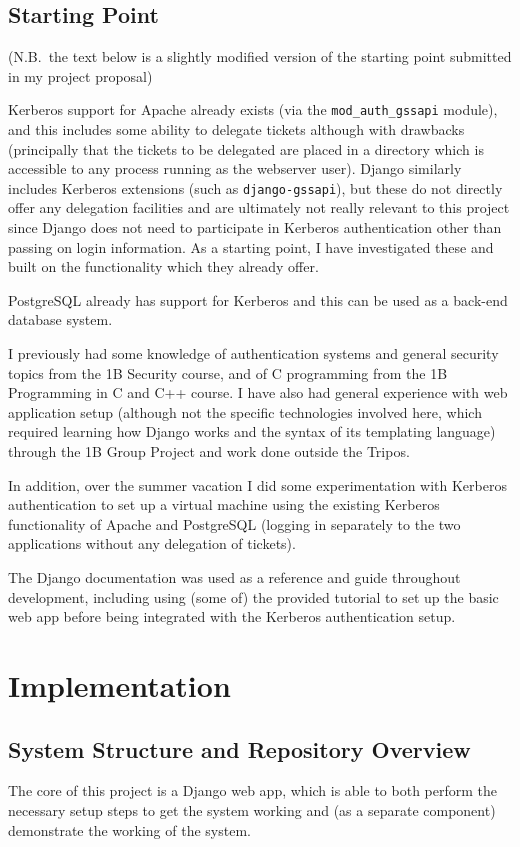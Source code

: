 \documentclass{article}
\begin{document}
\subsection{Starting Point}
(N.B.\ the text below is a slightly modified version of the starting point submitted in my project proposal)

Kerberos support for Apache already exists (via the \verb+mod_auth_gssapi+ module), and this includes some ability to delegate tickets although with drawbacks (principally that the tickets to be delegated are placed in a directory which is accessible to any process running as the webserver user). Django similarly includes Kerberos extensions (such as \verb+django-gssapi+), but these do not directly offer any delegation facilities and are ultimately not really relevant to this project since Django does not need to participate in Kerberos authentication other than passing on login information. As a starting point, I have investigated these and built on the functionality which they already offer.

PostgreSQL already has support for Kerberos and this can be used as a back-end database system.

I previously had some knowledge of authentication systems and general security topics from the 1B Security course, and of C programming from the 1B Programming in C and C++ course. I have also had general experience with web application setup (although not the specific technologies involved here, which required learning how Django works and the syntax of its templating language) through the 1B Group Project and work done outside the Tripos.

In addition, over the summer vacation I did some experimentation with Kerberos authentication to set up a virtual machine using the existing Kerberos functionality of Apache and PostgreSQL (logging in separately to the two applications without any delegation of tickets).

The Django documentation\cite{Django-docs} was used as a reference and guide throughout development, including using (some of) the provided tutorial to set up the basic web app before being integrated with the Kerberos authentication setup.


\section{Implementation}

\subsection{System Structure and Repository Overview}
The core of this project is a Django web app, which is able to both perform the necessary setup steps to get the system working and (as a separate component) demonstrate the working of the system.
\end{document}
